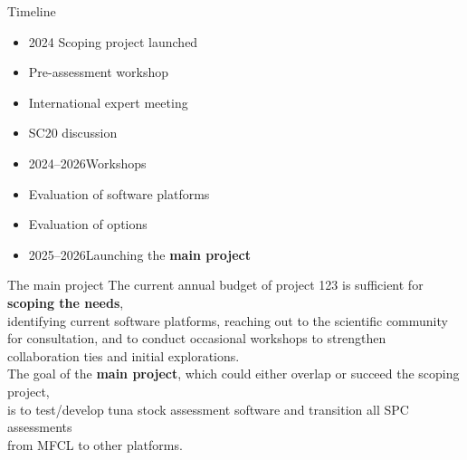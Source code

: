 \documentclass[aspectratio=169,fleqn]{beamer}
\begin{document}

\begin{frame}{Timeline}
  \begin{itemize}
    \item[] 2024 \quad Scoping project launched\\[1ex]
    \item[] \phantom{2024} \quad Pre-assessment workshop\\[1ex]
    \item[] \phantom{2024} \quad International expert meeting\\[1ex]
    \item[] \phantom{2024} \quad SC20 discussion\\[3ex]
    \item[] 2024--2026\quad Workshops\\[1ex]
    \item[] \phantom{2024--2026}\quad Evaluation of software platforms\\[1ex]
    \item[] \phantom{2024--2026}\quad Evaluation of options\\[3ex]
    \item[] 2025--2026\quad Launching the {\darkgreen\bf main project}\\[3ex]
  \end{itemize}
\end{frame}


\begin{frame}{The main project}
  The current annual budget of project 123 is sufficient for {\darkgreen\bf
    scoping the needs},\\[0.5ex]
  identifying current software platforms, reaching out to the scientific
  community\\[0.5ex]
  for consultation, and to conduct occasional workshops to strengthen\\[0.5ex]
  collaboration ties and initial explorations.\\[5ex]
  The goal of the {\darkgreen\bf main project}, which could either overlap or
  succeed the scoping project,\\[0.5ex]
  is to test/develop tuna stock assessment software and transition all SPC
  assessments\\[0.5ex]
  from MFCL to other platforms.\\[2ex]
\end{frame}
\end{document}
